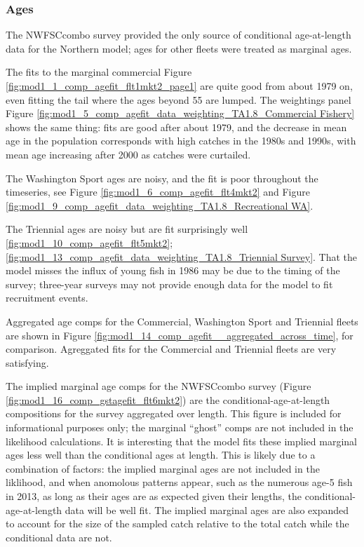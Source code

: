 \documentclass[12pt,]{article}
\begin{document}
\subsubsection{Ages}\label{ages}

The NWFSCcombo survey provided the only source of conditional
age-at-length data for the Northern model; ages for other fleets were
treated as marginal ages.

The fits to the marginal commercial Figure
\ref{fig:mod1_1_comp_agefit_flt1mkt2_page1} are quite good from about
1979 on, even fitting the tail where the ages beyond 55 are lumped. The
weightings panel Figure
\ref{fig:mod1_5_comp_agefit_data_weighting_TA1.8_Commercial Fishery}
shows the same thing: fits are good after about 1979, and the decrease
in mean age in the population corresponds with high catches in the 1980s
and 1990s, with mean age increasing after 2000 as catches were
curtailed.

The Washington Sport ages are noisy, and the fit is poor throughout the
timeseries, see Figure \ref{fig:mod1_6_comp_agefit_flt4mkt2} and Figure
\ref{fig:mod1_9_comp_agefit_data_weighting_TA1.8_Recreational WA}.

The Triennial ages are noisy but are fit surprisingly well
\ref{fig:mod1_10_comp_agefit_flt5mkt2};
\ref{fig:mod1_13_comp_agefit_data_weighting_TA1.8_Triennial Survey}.
That the model misses the influx of young fish in 1986 may be due to the
timing of the survey; three-year surveys may not provide enough data for
the model to fit recruitment events.

Aggregated age comps for the Commercial, Washington Sport and Triennial
fleets are shown in Figure
\ref{fig:mod1_14_comp_agefit__aggregated_across_time}, for comparison.
Agreggated fits for the Commercial and Triennial fleets are very
satisfying.

The implied marginal age comps for the NWFSCcombo survey (Figure
\ref{fig:mod1_16_comp_gstagefit_flt6mkt2}) are the
conditional-age-at-length compositions for the survey aggregated over
length. This figure is included for informational purposes only; the
marginal ``ghost'' comps are not included in the likelihood
calculations. It is interesting that the model fits these implied
marginal ages less well than the conditional ages at length. This is
likely due to a combination of factors: the implied marginal ages are
not included in the liklihood, and when anomolous patterns appear, such
as the numerous age-5 fish in 2013, as long as their ages are as
expected given their lengths, the conditional-age-at-length data will be
well fit. The implied marginal ages are also expanded to account for the
size of the sampled catch relative to the total catch while the
conditional data are not.
\end{document}
